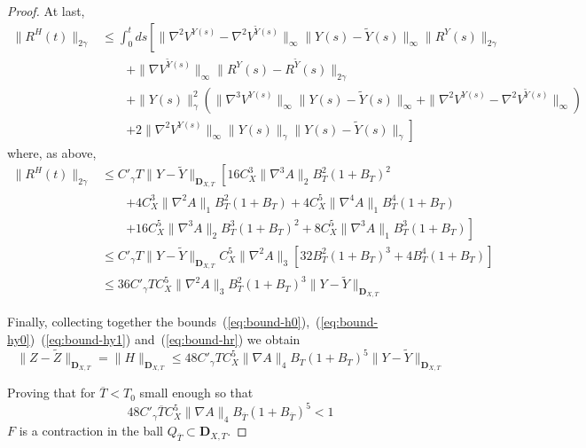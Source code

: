\documentclass[a4paper,12pt,reqno]{amsart}
\newcommand{\wt}{\widetilde}
\newcommand{\norm}[1]{\|#1\|}
\newcommand{\DXT}{\mathbf{D}_{X,T}}
\begin{document}
\begin{proof}
At last,
\begin{equation*}
  \begin{split}
\norm{R^H(t)}_{2\gamma} & \le \int_0^t ds \left[
\norm{\nabla^2 V^{Y(s)}-\nabla^2 V^{\wt Y(s)}}_\infty \norm{Y(s)-\wt
  Y(s)}_\infty \norm{R^Y(s)}_{2\gamma}
\right . \\ & \qquad \left.
+ \norm{\nabla V^{\wt
    Y(s)}}_\infty \norm{R^Y(s) - R^{\wt Y}(s)}_{2\gamma}
\right . \\ & \qquad \left.
+ \norm{Y(s)}_{\gamma}^2 (\norm{\nabla^3 V^{Y(s)}}_\infty \norm{Y(s)-\wt
  Y(s)}_\infty
+ \norm{\nabla^2 V^{Y(s)}-\nabla^2 V^{\wt Y(s)}}_\infty)
\right . \\ & \qquad \left.
+ 2 \norm{\nabla^2 V^{Y(s)}}_\infty \norm{Y(s)}_\gamma \norm{Y(s)-\wt Y(s)}_\gamma
\right]
  \end{split}
\end{equation*}
where, as above,
\begin{equation}
\label{eq:bound-hr}
  \begin{split}
\norm{R^H(t)}_{2\gamma} & \le C'_\gamma T \norm{Y-\wt Y}_{\DXT} \left[
16 C_X^3 \norm{\nabla^3 A}_2 B_T^2 (1+B_T)^2
\right . \\ & \qquad \left.
+
4 C_X^3 \norm{\nabla^2 A}_1 B_T^2 (1+B_T)
+
4 C_X^5 \norm{\nabla^4 A}_1 B_T^4 (1+B_T)
\right . \\ & \qquad \left.
+
16 C_X^5 \norm{\nabla^3 A}_2 B_T^3 (1+B_T)^2
+
8  C_X^5 \norm{\nabla^3 A}_1 B_T^3 (1+B_T)
\right]
\\ & \le C'_\gamma T \norm{Y-\wt Y}_{\DXT} C_X^5 \norm{\nabla^2 A}_3
[32 B_T^2 (1+B_T)^3 + 4 B_T^4 (1+B_T)]
\\ & \le 36 C'_\gamma T  C_X^5 \norm{\nabla^2 A}_3
 B_T^2 (1+B_T)^3 \norm{Y-\wt Y}_{\DXT}
  \end{split}
\end{equation}

Finally, collecting together the
bounds~(\ref{eq:bound-h0}),~(\ref{eq:bound-hy0})~(\ref{eq:bound-hy1})
and~(\ref{eq:bound-hr})
we obtain
\begin{equation*}
  \norm{Z-\wt Z}_{\DXT} = \norm{H}_{\DXT} \le 48
C'_\gamma T  C_X^5 \norm{\nabla A}_4
 B_T (1+B_T)^5 \norm{Y-\wt Y}_{\DXT}
\end{equation*}

Proving that for $\overline{T} < T_0$ small enough so that
\begin{equation*}
  48
C'_\gamma \overline{T}  C_X^5 \norm{\nabla A}_4
 B_{\overline{T}} (1+B_{\overline{T}})^5 < 1
\end{equation*}
$F$ is a contraction in the ball $Q_{\overline{T}}\subset\DXT$.
\end{proof}
\end{document}
